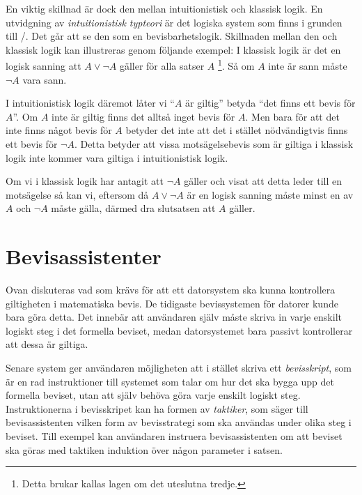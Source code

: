 En viktig skillnad är dock den mellan intuitionistisk och klassisk logik. En
utvidgning av \emph{intuitionistisk typteori}\cite{martin1984intuitionistic} är
det logiska system som finns i grunden till
\coq{}/\ssr{}\cite{bertot2004interactive}. Det går att se den som en
bevisbarhetslogik. Skillnaden mellan den och klassisk logik kan illustreras
genom följande exempel: I klassisk logik är det en logisk sanning att $A \lor
\neg A$ gäller för alla satser $A$ \footnote{Detta brukar kallas lagen om det
uteslutna tredje.}. Så om $A$ inte är sann måste $\neg A$ vara
sann\cite{bennet2004forsta}.

I intuitionistisk logik däremot låter vi ``$A$ är giltig'' betyda ``det finns
ett bevis för $A$''. Om $A$ inte är giltig finns det alltså inget bevis för
$A$. Men bara för att det inte finns något bevis för $A$ betyder det inte att
det i stället nödvändigtvis finns ett bevis för $\neg A$. Detta betyder att
vissa motsägelsebevis som är giltiga i klassisk logik inte kommer vara giltiga
i intuitionistisk logik\cite{barendregt2001proofdependent}.

Om vi i klassisk logik har antagit att $\neg A$ gäller och visat att detta
leder till en motsägelse så kan vi, eftersom då $A \lor \neg A$ är en logisk
sanning måste minst en av $A$ och $\neg A$ måste gälla, därmed dra slutsatsen
att $A$ gäller.

\section{Bevisassistenter}
Ovan diskuteras vad som krävs för att ett datorsystem ska kunna kontrollera
giltigheten i matematiska bevis. De tidigaste bevissystemen för datorer kunde
bara göra detta. Det innebär att användaren själv måste skriva in varje enskilt
logiskt steg i det formella beviset, medan datorsystemet bara passivt
kontrollerar att dessa är giltiga.

Senare system ger användaren möjligheten att i stället skriva ett
\emph{bevisskript}, som är en rad instruktioner till systemet som
talar om hur det ska bygga upp det formella beviset, utan att själv
behöva göra varje enskilt logiskt steg.
Instruktionerna i bevisskripet kan ha formen av \emph{taktiker}, som säger
till bevisassistenten vilken form av bevisstrategi som ska användas
under olika steg i beviset.
Till exempel kan användaren instruera bevisassistenten om att beviset ska
göras med taktiken induktion över någon parameter i satsen.

